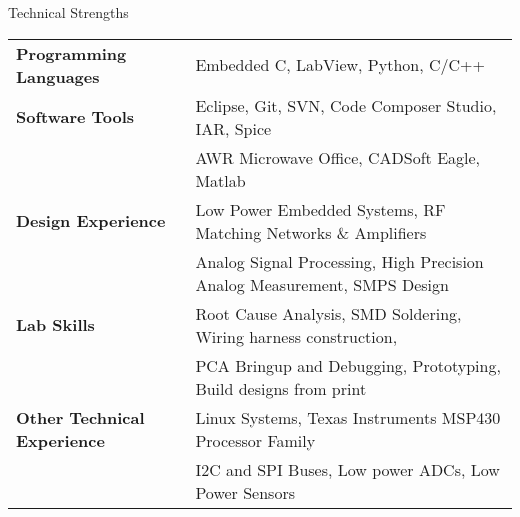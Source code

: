 \documentclass{resume} %
\begin{document}

\begin{rSection}{Technical Strengths}

\begin{tabular}{ @{} >{\bfseries}l @{\hspace{6ex}} l }
Programming Languages & Embedded C, LabView, Python, C/C++  \smallskip \\

Software Tools & Eclipse, Git, SVN, Code Composer Studio, IAR, Spice\\ 
 & AWR Microwave Office, CADSoft Eagle, Matlab \smallskip \\

Design Experience & Low Power Embedded Systems, RF Matching Networks \& Amplifiers\\
 & Analog Signal Processing, High Precision Analog Measurement, SMPS Design \smallskip \\
 
Lab Skills & Root Cause Analysis, SMD Soldering, Wiring harness construction,\\
& PCA Bringup and Debugging, Prototyping, Build designs from print\smallskip \\
 
Other Technical Experience & Linux Systems, Texas Instruments MSP430 Processor Family \\
& I2C and SPI Buses, Low power ADCs, Low Power Sensors\\
\end{tabular}

\end{rSection}
\medskip
\end{document}

